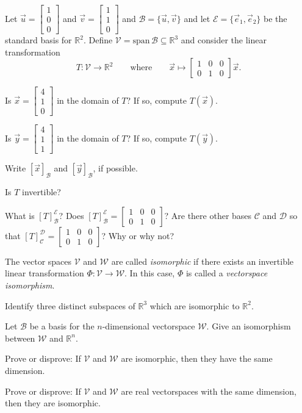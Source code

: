 \documentclass[14pt]{problemset}
\newcommand{\R}{\mathbb{R}}
\newcommand{\Span}{\mathrm{span}\,}
\newcommand{\mat}[1]{\begin{bmatrix}#1\end{bmatrix}}
\begin{document}
	\newpage

	\question
	Let $\vec u=\mat{1\\0\\0}$ and $\vec v=\mat{1\\1\\0}$ and $\mathscr B=\{\vec u,\vec v\}$
	and let $\mathscr E=\{\vec e_1,\vec e_2\}$ be the standard basis for $\R^2$. Define $\mathcal V=\Span \mathscr B\subseteq \R^3$ 
	and consider
	the linear transformation 
	\[
		T:\mathcal V\to\R^2\qquad\text{where}\qquad \vec x\mapsto \mat{1&0&0\\0&1&0}\vec x.
	\]
	\begin{parts}
		\item Is $\vec x=\mat{4\\1\\0}$ in the domain of $T$? If so, compute $T(\vec x)$.
		\item Is $\vec y=\mat{4\\1\\1}$ in the domain of $T$? If so, compute $T(\vec y)$.
		\item Write $[\vec x]_{\mathscr B}$ and $[\vec y]_{\mathscr B}$, if possible.
		\item Is $T$ invertible?
		\item What is $[T]_{\mathscr B}^{\mathscr E}$? Does $[T]_{\mathscr B}^{\mathscr E}=\mat{1&0&0\\0&1&0}$?
			Are there other bases $\mathscr C$ and $\mathscr D$ so that $[T]_{\mathscr C}^{\mathscr D}=\mat{1&0&0\\0&1&0}$?
			Why or why not?

	\end{parts}

	\begin{definition}[Isomorphic]
		The vector spaces $\mathcal V$ and $\mathcal W$ are called \emph{isomorphic}
		if there exists an invertible linear transformation $\Phi:\mathcal V\to\mathcal W$.
		In this case, $\Phi$ is called a \emph{vectorspace isomorphism}.
	\end{definition}
	\question
	\begin{parts}
		\item Identify three distinct subspaces of $\R^3$ which are isomorphic to $\R^2$.
		\item Let $\mathscr B$ be a basis for the $n$-dimensional vectorspace $\mathcal W$.
			Give an isomorphism between $\mathcal W$ and $\R^n$.
		\item Prove or disprove: If $\mathcal V$ and $\mathcal W$ are isomorphic, then
			they have the same dimension.
		\item Prove or disprove: If $\mathcal V$ and $\mathcal W$ are real vectorspaces
			with the same dimension, then they are isomorphic.
	\end{parts}
\end{document}
